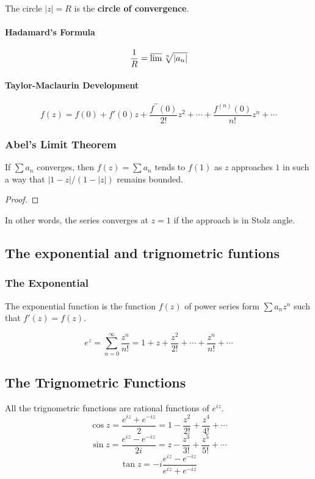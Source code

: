 The circle $|z| = R$ is the \textbf{circle of convergence}.
\paragraph{Hadamard's Formula}
\begin{equation}
	\frac{1}{R} = \varlimsup \sqrt[n]{|a_n|}
\end{equation}

\paragraph{Taylor-Maclaurin Development}
\begin{equation}
	f(z) = f(0) + f'(0)z + \frac{f^{\prime\prime}(0)}{2!}z^2 + \dotsb + \frac{f^{(n)}(0)}{n!}z^n + \dotsb
\end{equation}

\subsubsection{Abel's Limit Theorem}
\begin{theorem}[Abel]
	If $\sum a_n$ converges, then $f(z) = \sum a_n$ tends to $f(1)$ as $z$ approaches $1$ in such a way that $|1-z|/(1-|z|)$ remains bounded.
\end{theorem}
\begin{proof}
\end{proof}

In other words, the series converges at $z=1$ if the approach is in Stolz angle.

\subsection{The exponential and trignometric funtions}
\subsubsection{The Exponential}
\begin{definition}
	The exponential function is the function $f(z)$ of power series form $\sum a_n z^n$ such that $f'(z) = f(z)$.
\end{definition}
\[ e^z = \sum_{n = 0}^\infty \frac{z^n}{n!} = 1 + z + \frac{z^2}{2!} + \dotsb + \frac{z^n}{n!} + \dotsb \]
\subsection{The Trignometric Functions}
All the trignometric functions are rational functions of $e^{iz}$.
\[ \cos z = \frac{e^{iz}+e^{-iz}}{2} = 1 - \frac{z^2}{2!} + \frac{z^4}{4!} + \dotsb \]
\[ \sin z = \frac{e^{iz}-e^{-iz}}{2i} = z - \frac{z^3}{3!} + \frac{z^5}{5!} + \dotsb \]
\[ \tan z = -i \frac{e^{iz}-e^{-iz}}{e^{iz}+e^{-iz}} \]

